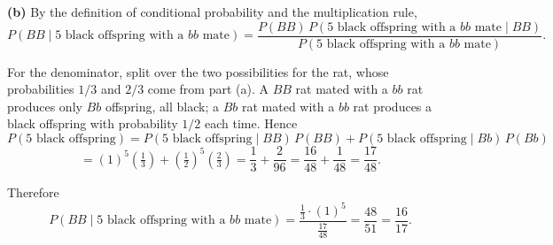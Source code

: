 \documentclass[11pt]{article}
\begin{document}
\medskip
\textbf{(b)} By the definition of conditional probability and the multiplication
rule,
\[
  P(BB \mid \text{5 black offspring with a $bb$ mate})
    = \frac{P(BB)\, P(\text{5 black offspring with a $bb$ mate} \mid BB)}
           {P(\text{5 black offspring with a $bb$ mate})} .
\]

For the denominator, split over the two possibilities for the rat, whose
probabilities $1/3$ and $2/3$ come from part (a). A $BB$ rat mated with a $bb$
rat produces only $Bb$ offspring, all black; a $Bb$ rat mated with a $bb$ rat
produces a black offspring with probability $1/2$ each time. Hence
\[
  P(\text{5 black offspring})
    = P(\text{5 black offspring} \mid BB)\, P(BB)
      + P(\text{5 black offspring} \mid Bb)\, P(Bb)
\]
\[
    = (1)^{5}\left(\tfrac{1}{3}\right)
      + \left(\tfrac{1}{2}\right)^{5}\left(\tfrac{2}{3}\right)
    = \frac{1}{3} + \frac{2}{96}
    = \frac{16}{48} + \frac{1}{48}
    = \frac{17}{48} .
\]

Therefore
\[
  P(BB \mid \text{5 black offspring with a $bb$ mate})
    = \frac{\tfrac{1}{3} \cdot (1)^{5}}{\tfrac{17}{48}}
    = \frac{48}{51}
    = \frac{16}{17} .
\]
\end{document}
